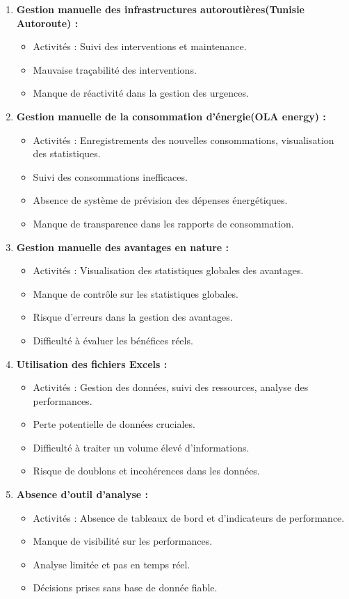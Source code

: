 \documentclass[a4paper,11pt]{report}
\begin{document}
\begin{enumerate}
\item \textbf{Gestion manuelle des infrastructures autoroutières(Tunisie Autoroute) : } \nopagebreak[4]

\begin{itemize}
	\item Activités : Suivi des interventions et maintenance.
	\item Mauvaise traçabilité des interventions.
	\item Manque de réactivité dans la gestion des urgences.
\end{itemize}

\item \textbf{Gestion manuelle de la consommation d'énergie(OLA energy) : } \nopagebreak[4]
\begin{itemize}
	\item Activités : Enregistrements des nouvelles consommations, visualisation des statistiques.
	\item Suivi des consommations inefficaces.
	\item Absence de système de prévision des dépenses énergétiques.
	\item Manque de transparence dans les rapports de consommation.
\end{itemize}
\item \textbf{Gestion manuelle des avantages en nature : }
\begin{itemize}
	\item Activités : Visualisation des statistiques globales des avantages.
	\item Manque de contrôle sur les statistiques globales.
	\item Risque d'erreurs dans la gestion des avantages.
	\item Difficulté à évaluer les bénéfices réels.
\end{itemize}
\item \textbf{Utilisation des fichiers Excels : }
\begin{itemize}
	\item Activités : Gestion des données, suivi des ressources, analyse des performances.
	\item Perte potentielle de données cruciales.
	\item Difficulté à traiter un volume élevé d'informations.
	\item Risque de doublons et incohérences dans les données.
\end{itemize}

\item \textbf{Absence d'outil d'analyse : }
\begin{itemize}
	\item Activités : Absence de tableaux de bord et d'indicateurs de performance.
	\item Manque de visibilité sur les performances.
	\item Analyse limitée et pas en temps réel.
	\item Décisions prises sans base de donnée fiable.
\end{itemize}


\end{enumerate}
\end{document}
